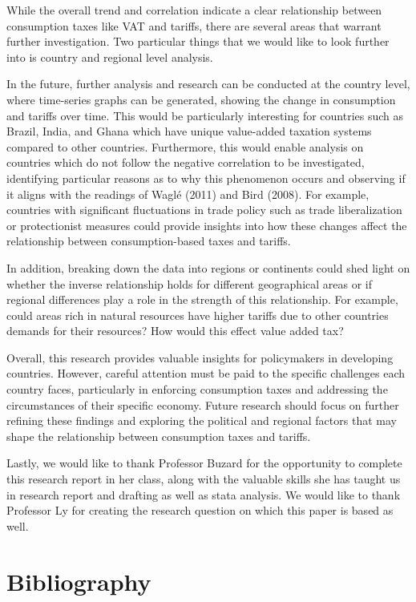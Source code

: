 \documentclass[12pt]{article}
\begin{document}
While the overall trend and correlation indicate a clear relationship between consumption taxes like VAT and tariffs, there are several areas that warrant further investigation. Two particular things that we would like to look further into is country and regional level analysis. 

In the future, further analysis and research can be conducted at the country level, where time-series graphs can be generated, showing the change in consumption and tariffs over time. This would be particularly interesting for countries such as Brazil, India, and Ghana which have unique value-added taxation systems compared to other countries. Furthermore, this would enable analysis on countries which do not follow the negative correlation to be investigated, identifying particular reasons as to why this phenomenon occurs and observing if it aligns with the readings of Waglé (2011) and Bird (2008).  For example, countries with significant fluctuations in trade policy such as trade liberalization or protectionist measures could provide insights into how these changes affect the relationship between consumption-based taxes and tariffs. 

In addition, breaking down the data into regions or continents could shed light on whether the inverse relationship holds for different geographical areas or if regional differences play a role in the strength of this relationship. For example, could areas rich in natural resources have higher tariffs due to other countries demands for their resources? How would this effect value added tax? 

Overall, this research provides valuable insights for policymakers in developing countries. However, careful attention must be paid to the specific challenges each country faces, particularly in enforcing consumption taxes and addressing the circumstances of their specific economy. Future research should focus on further refining these findings and exploring the political and regional factors that may shape the relationship between consumption taxes and tariffs.

Lastly, we would like to thank Professor Buzard for the opportunity to complete this research report in her class, along with the valuable skills she has taught us in research report and drafting as well as stata analysis. We would like to thank Professor Ly for creating the research question on which this paper is based as well. 

\newpage
\section*{Bibliography}
\singlespacing
\setlength\bibsep{0pt}
\end{document}
